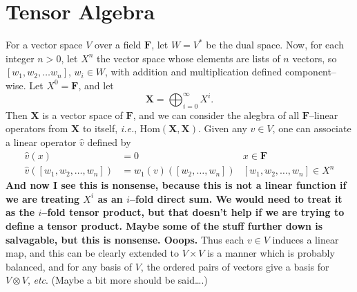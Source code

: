 \documentclass{article}
\begin{document}
\section{Tensor Algebra}
For a vector space $V$ over a field $\mathbf{F}$, let $W=V^*$ be the dual space.
Now, for each integer $n>0$, let $X^n$ the vector space whose elements are
lists of $n$ vectors, so $\left[w_1, w_2, \ldots w_n\right]$, $w_i \in W$, with addition
and multiplication defined component--wise.  Let $X^0 = \mathbf{F}$, and let
\begin{equation}
  \mathbf{X}  = \bigoplus_{i=0}^\infty X^i.
\end{equation}
Then $\mathbf{X}$ is a vector space of $\mathbf{F}$, and we can consider the alegbra of
all $\mathbf{F}$--linear operators from $\mathbf{X}$ to itself, \emph{i.e.}, 
$\text{Hom}(\mathbf{X}, \mathbf{X})$.
Given any $v \in V$, one can associate a linear operator $\hat{v}$ defined by
\begin{align}
  \hat{v}(x) & = 0 & x \in \mathbf{F} \\
  \hat{v}\left(\left[ w_1, w_2, \ldots, w_n\right]\right) 
      &= w_1(v) \left(\left[ w_2, \ldots, w_n\right]\right)  &
           \left[ w_1, w_2, \ldots, w_n\right] \in X^n
\end{align}
\textbf{ And now I see this is nonsense, because this is not a linear function if we are
treating $X^i$ as an $i$--fold direct sum.   We would need to treat it as the 
$i$--fold tensor product, but that doesn't help if we are trying to define a tensor product.
Maybe some of the stuff further down is salvagable, but this is nonsense. Ooops.}
Thus each $v\in V$ induces a linear map, and this can be clearly extended to $V \times V$ is
a manner which is probably balanced, and for any basis of $V$, the ordered pairs of
vectors give a basis for $V\otimes V$, \emph{etc}. (Maybe a bit more should be said\ldots.)
\end{document}
